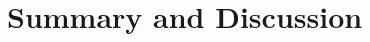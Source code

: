 \documentclass[11pt]{article}
\theoremstyle{plain}
\theoremstyle{definition}
\newcommand{\so}{\sigma^*}
\begin{document}
%

%
\section{Summary and Discussion}



\end{document}
